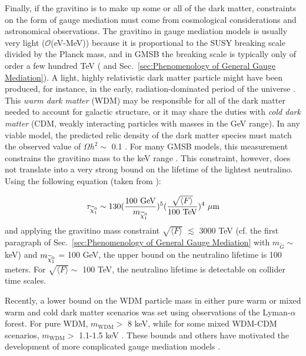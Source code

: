 \documentclass[dissertation.tex]{subfiles}
\begin{document}
Finally, if the gravitino is to make up some or all of the dark matter, constraints on the form of gauge mediation must come from cosmological considerations and astronomical observations.  The gravitino in gauge mediation models is usually very light ($\mathcal{O}$(eV-MeV)) because it is proportional to the SUSY breaking scale divided by the Planck mass, and in GMSB the breaking scale is typically only of order a few hundred TeV (\cite{SUSY_primer} and Sec.~\ref{sec:Phenomenology of General Gauge Mediation}).  A light, highly relativistic dark matter particle might have been produced, for instance, in the early, radiation-dominated period of the universe \cite{1475-7516-2009-05-012}.  This \textit{warm dark matter} (WDM) may be responsible for all of the dark matter needed to account for galactic structure, or it may share the duties with \textit{cold dark matter} (CDM, weakly interacting particles with masses in the GeV range).  In any viable model, the predicted relic density of the dark matter species must match the observed value of $\Omega h^{2} \sim$ 0.1 \cite{0067-0049-180-2-330}.  For many GMSB models, this measurement constrains the gravitino mass to the keV range \cite{PhysRevD.58.075005}.  This constraint, however, does not translate into a very strong bound on the lifetime of the lightest neutralino.  Using the following equation (taken from \cite{PhysRevD.58.075005}):

\begin{equation}
\tau_{\widetilde{\chi}_{1}^{0}} \sim 130(\frac{100\mbox{ GeV}}{m_{\widetilde{\chi}_{1}^{0}}})^{5}(\frac{\sqrt{\langle F\rangle}}{100\mbox{ TeV}})^{4}\mbox{ }\mu\mbox{m}
\end{equation}
%
and applying the gravitino mass constraint $\sqrt{\langle F\rangle}$ $\lesssim$ 3000 TeV (cf. the first paragraph of Sec.~\ref{sec:Phenomenology of General Gauge Mediation} with $m_{\widetilde{G}} \sim$ keV) and $m_{\widetilde{\chi}_{1}^{0}}$ = 100 GeV, the upper bound on the neutralino lifetime is 100 meters.  For $\sqrt{\langle F\rangle} \sim$ 100 TeV, the neutralino lifetime is detectable on collider time scales.

Recently, a lower bound on the WDM particle mass in either pure warm or mixed warm and cold dark matter scenarios was set using observations of the Lyman-$\alpha$ forest.  For pure WDM, $m_{\mathrm{WDM}} >$ 8 keV, while for some mixed WDM-CDM scenarios, $m_{\mathrm{WDM}} >$ 1.1-1.5 keV \cite{1475-7516-2009-05-012,springerlink:10.1007/JHEP01(2010)058}.  These bounds and others have motivated the development of more complicated gauge mediation models \cite{springerlink:10.1007/JHEP01(2010)058}.
\end{document}
